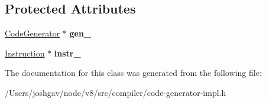 \subsection*{Protected Attributes}
\begin{DoxyCompactItemize}
\item 
\hyperlink{classv8_1_1internal_1_1compiler_1_1_code_generator}{Code\+Generator} $\ast$ {\bfseries gen\+\_\+}\hypertarget{classv8_1_1internal_1_1compiler_1_1_instruction_operand_converter_acc0d3914ad583d50353785bd96bd3419}{}\label{classv8_1_1internal_1_1compiler_1_1_instruction_operand_converter_acc0d3914ad583d50353785bd96bd3419}

\item 
\hyperlink{classv8_1_1internal_1_1compiler_1_1_instruction}{Instruction} $\ast$ {\bfseries instr\+\_\+}\hypertarget{classv8_1_1internal_1_1compiler_1_1_instruction_operand_converter_aa5523456b16d6f10745fc917a47dbc4f}{}\label{classv8_1_1internal_1_1compiler_1_1_instruction_operand_converter_aa5523456b16d6f10745fc917a47dbc4f}

\end{DoxyCompactItemize}


The documentation for this class was generated from the following file\+:\begin{DoxyCompactItemize}
\item 
/\+Users/joshgav/node/v8/src/compiler/code-\/generator-\/impl.\+h\end{DoxyCompactItemize}

